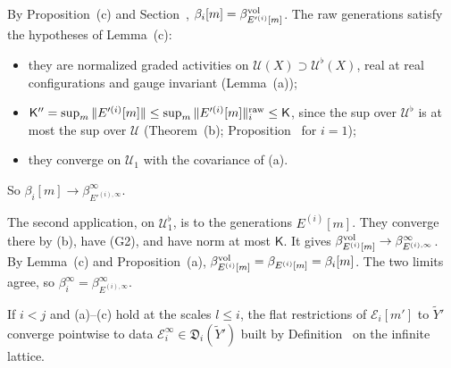\begin{step}[(a)$\Rightarrow$(c)]
By Proposition~(c) and Section~, $\beta_i[m]=\beta^{\rm vol}_{E'^{(i)}[m]}$. The raw generations satisfy the hypotheses of Lemma~(c):
\begin{itemize}
\item they are normalized graded activities on $\mathcal U(X)\supset\mathcal U^\flat(X)$, real at real configurations and gauge invariant (Lemma~(a));
\item $\mathsf K''=\sup_m\|E'^{(i)}[m]\|\le\sup_m\|E'^{(i)}[m]\|^{\rm raw}_i\le\mathsf K$, since the sup over $\mathcal U^\flat$ is at most the sup over $\mathcal U$ (Theorem~(b); Proposition~ for $i=1$);
\item they converge on $\mathcal U_1$ with the covariance of (a).
\end{itemize}
So $\beta_i[m]\to\beta^\infty_{E'^{(i),\infty}}$.

The second application, on $\mathcal U^\flat_1$, is to the generations $E^{(i)}[m]$. They converge there by (b), have (G2), and have norm at most $\mathsf K$. It gives $\beta^{\rm vol}_{E^{(i)}[m]}\to\beta^\infty_{E^{(i),\infty}}$. By Lemma~(c) and Proposition~(a), $\beta^{\rm vol}_{E^{(i)}[m]}=\beta_{E^{(i)}[m]}=\beta_i[m]$. The two limits agree, so $\beta^\infty_i=\beta^\infty_{E^{(i),\infty}}$.
\end{step}

\begin{detail}\label{d11b:gen-locality-d}
If $i<j$ and (a)--(c) hold at the scales $l\le i$, the flat restrictions of $\mathcal E_i[m']$ to $\tilde Y'$ converge pointwise to data $\mathcal E^\infty_i\in\mathfrak D_i(\tilde Y')$ built by Definition~ on the infinite lattice.
\end{detail}


